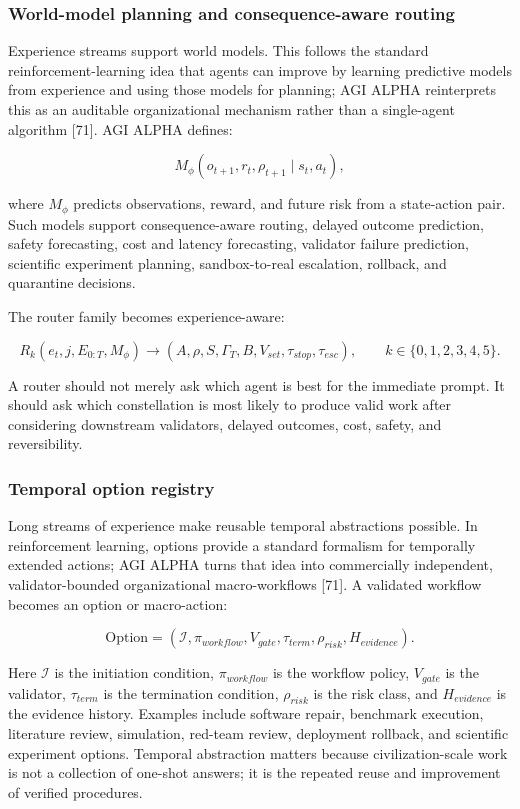 \documentclass[
  11pt,
]{article}
\begin{document}
\subsubsection{World-model planning and consequence-aware
routing}\label{world-model-planning-and-consequence-aware-routing}

Experience streams support world models. This follows the standard
reinforcement-learning idea that agents can improve by learning
predictive models from experience and using those models for planning;
AGI ALPHA reinterprets this as an auditable organizational mechanism
rather than a single-agent algorithm {[}71{]}. AGI ALPHA defines:

\[
M_\phi(o_{t+1},r_t,\rho_{t+1}\mid s_t,a_t),
\]

where \(M_\phi\) predicts observations, reward, and future risk from a
state-action pair. Such models support consequence-aware routing,
delayed outcome prediction, safety forecasting, cost and latency
forecasting, validator failure prediction, scientific experiment
planning, sandbox-to-real escalation, rollback, and quarantine
decisions.

The router family becomes experience-aware:

\[
R_k(e_t,j,E_{0:T},M_\phi)\rightarrow(A,\rho,S,\Gamma_T,B,V_{set},\tau_{stop},\tau_{esc}),\qquad k\in\{0,1,2,3,4,5\}.
\]

A router should not merely ask which agent is best for the immediate
prompt. It should ask which constellation is most likely to produce
valid work after considering downstream validators, delayed outcomes,
cost, safety, and reversibility.

\subsubsection{Temporal option registry}\label{temporal-option-registry}

Long streams of experience make reusable temporal abstractions possible.
In reinforcement learning, options provide a standard formalism for
temporally extended actions; AGI ALPHA turns that idea into commercially
independent, validator-bounded organizational macro-workflows {[}71{]}.
A validated workflow becomes an option or macro-action:

\[
\mathrm{Option}=(\mathcal{I},\pi_{workflow},V_{gate},\tau_{term},\rho_{risk},H_{evidence}).
\]

Here \(\mathcal{I}\) is the initiation condition, \(\pi_{workflow}\) is
the workflow policy, \(V_{gate}\) is the validator, \(\tau_{term}\) is
the termination condition, \(\rho_{risk}\) is the risk class, and
\(H_{evidence}\) is the evidence history. Examples include software
repair, benchmark execution, literature review, simulation, red-team
review, deployment rollback, and scientific experiment options. Temporal
abstraction matters because civilization-scale work is not a collection
of one-shot answers; it is the repeated reuse and improvement of
verified procedures.
\end{document}
